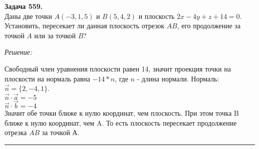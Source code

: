 \documentclass[a4paper, 12pt]{article}
\newenvironment{problem}[2][Задача]
    { \begin{mdframed}[backgroundcolor=gray!10] \textbf{#1 #2.} \\}
    {  \end{mdframed}}
\newenvironment{solution}
    {\textit{Решение: }}
    {\noindent\rule{7in}{1.5pt}}
\begin{document}
\begin{problem}{559}
Даны две точки $A(-3,1,5)$ и $B(5,4,2)$ и плоскость $ 2x - 4y + z + 14 = 0$.
Установить, пересекает ли данная плоскость отрезок $AB$, его продолжение за точкой $A$ или за точкой $B$?
\end{problem}
\begin{solution}

Свободный член уравнения плоскости равен 14,
значит проекция точки на плоскости на нормаль равна $-14 * n$, где $n$ - длина нормали.
Нормаль: $\vec{n} = \{2, -4, 1\}$. \\
$\vec{n} \cdot \vec{a} = -5$ \\
$\vec{n} \cdot \vec{b} = -4$ \\
Значит обе точки ближе к нулю координат, чем плоскость. При этом точка B ближе к нулю координат, чем A.
То есть плоскость пересекает продолжение отрезка $AB$ за точкой А.

\end{solution}
\end{document}
